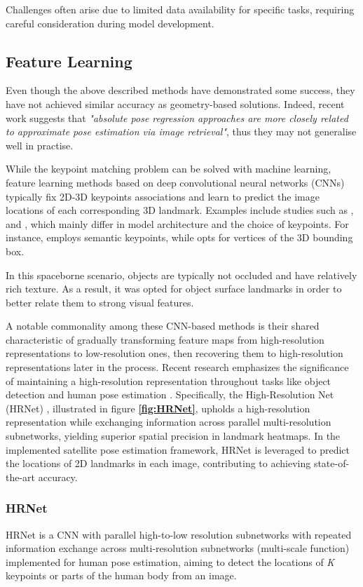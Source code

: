 Challenges often arise due to limited data availability for specific tasks, requiring careful consideration during model development.

\subsection{Feature Learning}
Even though the above described methods have demonstrated some success, they have not achieved similar accuracy as geometry-based solutions. Indeed, recent work \cite{LimCNN} suggests that \textit{"absolute pose regression approaches are more closely related to approximate pose estimation via image retrieval"}, thus they may not generalise  well in practise.

While the keypoint matching problem can be solved with machine learning, feature learning methods based on deep convolutional neural networks (CNNs) typically fix 2D-3D keypoints associations and learn to predict the image locations of each corresponding 3D landmark. Examples include studies such as \cite{E1}, \cite{E2} and \cite{E3}, which mainly differ in model architecture and the choice of keypoints. For instance, \cite{E2} employs semantic keypoints, while \cite{E3} opts for vertices of the 3D bounding box. 

In this spaceborne scenario, objects are typically not occluded and have relatively rich texture. As a result, it was opted for object surface landmarks in order to better relate them to strong visual features.

A notable commonality among these CNN-based methods is their shared characteristic of gradually transforming feature maps from high-resolution representations to low-resolution ones, then recovering them to high-resolution representations later in the process. Recent research emphasizes the significance of maintaining a high-resolution representation throughout tasks like object detection and human pose estimation \cite{sun2019deep}\cite{HRNet2}. Specifically, the High-Resolution Net (HRNet) \cite{sun2019deep}, illustrated in figure \textbf{\ref{fig:HRNet}}, upholds a high-resolution representation while exchanging information across parallel multi-resolution subnetworks, yielding superior spatial precision in landmark heatmaps. In the implemented satellite pose estimation framework, HRNet is leveraged to predict the locations of 2D landmarks in each image, contributing to achieving state-of-the-art accuracy.

\subsubsection{HRNet}
HRNet is a CNN with parallel high-to-low resolution subnetworks with repeated information exchange across multi-resolution subnetworks (multi-scale function) implemented for human pose estimation, aiming to detect the locations of \textit{K} keypoints or parts of the human body from an image.\\

